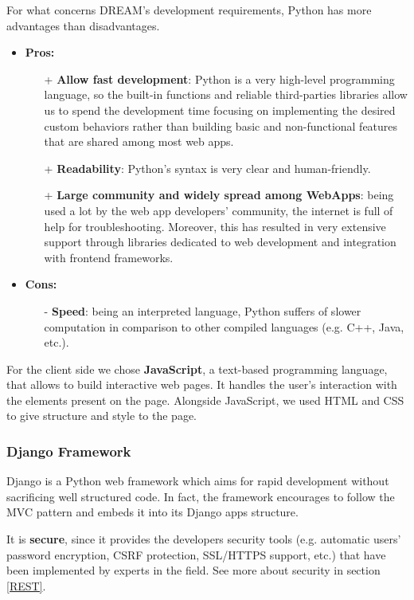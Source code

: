 \documentclass[table, 12pt]{article}
\begin{document}
For what concerns DREAM's development requirements, Python has more advantages than disadvantages.
\begin{itemize}
    \item \textbf{Pros:}
    \begin{itemize}
        \item[+] \textbf{Allow fast development}: Python is a very high-level programming language, so the built-in functions and reliable third-parties libraries allow us to spend the development time focusing on implementing the desired custom behaviors rather than building basic and non-functional features that are shared among most web apps.
        \item[+] \textbf{Readability}: Python's syntax is very clear and human-friendly.
        \item[+] \textbf{Large community and widely spread among WebApps}: being used a lot by the web app developers' community, the internet is full of help for troubleshooting. Moreover, this has resulted in very extensive support through libraries dedicated to web development and integration with frontend frameworks.
    \end{itemize}
    \item \textbf{Cons:}
    \begin{itemize}
        \item[-] \textbf{Speed}: being an interpreted language, Python suffers of slower computation in comparison to other compiled languages (e.g. C++, Java, etc.).
    \end{itemize}
\end{itemize}

For the client side we chose \textbf{JavaScript}, a text-based programming language, that allows to build interactive web pages. It handles the user's interaction with the elements present on the page.
Alongside JavaScript, we used HTML and CSS to give structure and style to the page.

\subsubsection{Django Framework}
Django is a Python web framework which aims for rapid development without sacrificing well structured code. In fact, the framework encourages to follow the MVC pattern and embeds it into its Django apps structure.

It is \textbf{secure}, since it provides the developers security tools (e.g. automatic users' password encryption, CSRF protection, SSL/HTTPS support, etc.) that have been implemented by experts in the field. See more about security in section \ref{REST}.
\end{document}
